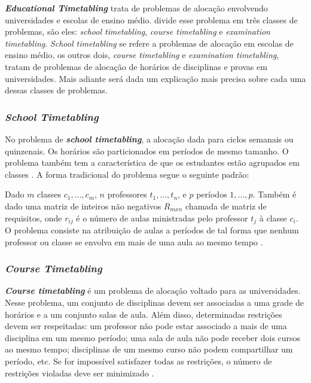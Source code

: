 \textbf{\textit{Educational Timetabling}} trata de problemas de alocação envolvendo universidades e escolas de ensino médio.  divide esse problema em três classes de problemas, são eles: \textit{school timetabling}, \textit{course timetabling} e \textit{examination timetabling}. \textit{School timetabling} se refere a problemas de alocação em escolas de ensino médio, os outros dois, \textit{course timetabling} e \textit{examination timetabling}, tratam de problemas de alocação de horários de disciplinas e provas em universidades. Mais adiante será dada um explicação mais precisa sobre cada uma dessas classes de problemas.

\subsubsection{\textit{School Timetabling}}

No problema de \textbf{\textit{school timetabling}}, a alocação dada para ciclos semanais ou quinzenais. Os horários são particionados em períodos de mesmo tamanho. O problema também tem a característica de que os estudantes estão agrupados em classes \cite{kingston2004tiling}. A forma tradicional do problema segue o seguinte padrão:

Dado $m$ classes $c_1, ..., c_m$, $n$ professores $t_1, ..., t_n$, e $p$ períodos $1, ..., p$. Também é dado uma matriz de inteiros não negativos $R_{mxn}$ chamada de matriz de requisitos, onde $r_{ij}$ é o número de aulas ministradas pelo professor $t_j$ à classe $c_i$.
O problema consiste na atribuição de aulas a períodos de tal forma que nenhum professor ou classe se envolva em mais de uma aula ao mesmo tempo \cite{vslechta2004decomposition}. 

\subsubsection{\textit{Course Timetabling}}

\textbf{\textit{Course timetabling}} é um problema de alocação voltado para as universidades. Nesse problema, um conjunto de disciplinas devem ser associadas a uma grade de horários e a um conjunto salas de aula. Além disso, determinadas restrições devem ser respeitadas: um professor não pode estar associado a mais de uma disciplina em um mesmo período; uma sala de aula não pode receber dois cursos ao mesmo tempo; disciplinas de um mesmo curso não podem compartilhar um período, etc. Se for impossível satisfazer todas as restrições, o número de restrições violadas deve ser minimizado \cite{lach2012curriculum}.

